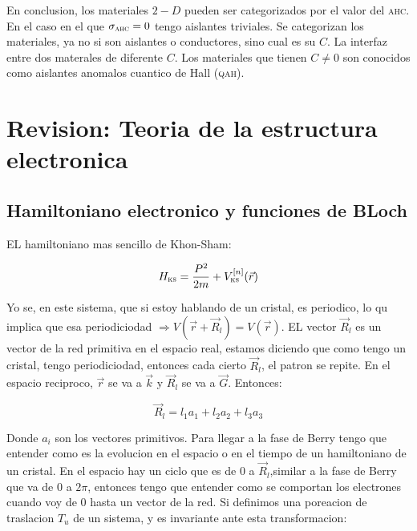 \documentclass[11pt,fleqn]{book}
\begin{document}
En conclusion, los materiales $2-D$ pueden ser categorizados por el valor del \textsc{ahc}. En el caso en el que $\sigma_{\textsc{ahc}}=0$ tengo aislantes triviales. Se categorizan los materiales, ya no si son aislantes o conductores, sino cual es su $C$. La interfaz entre dos materales de diferente $C$. Los materiales que tienen $C\neq0$ son conocidos como aislantes anomalos cuantico de Hall (\textsc{qah}).



\chapter{Revision: Teoria de la estructura electronica}
\section{Hamiltoniano electronico y funciones de BLoch}

EL hamiltoniano mas sencillo de Khon-Sham:

\begin{equation}
    H_{\textsc{ks}}=\frac{P^{2}}{2m}+V_{\textsc{ks}}^{[n]}(\vec{r})
\end{equation}

Yo se, en este sistema, que si estoy hablando de un cristal, es periodico, lo qu implica que esa periodiciodad $\Rightarrow V(\vec{r}+\vec{
R}_{l})=V(\vec{r})$. EL vector $\vec{R}_{l}$ es un vector de la red primitiva en el espacio real, estamos diciendo que como tengo un cristal, tengo periodiciodad, entonces cada cierto $\vec{R}_{l}$, el patron se repite. En el espacio reciproco, $\vec{r}$ se va a $\vec{k}$ y $\vec{R}_{l}$ se va a $\vec{G}$. Entonces:

\begin{equation}
    \vec{R}_{l}=l_{1}a_{1}+l_{2}a_{2}+l_{3}a_{3}
\end{equation}
 
Donde $a_{i}$ son los vectores primitivos. Para llegar a la fase de Berry tengo que entender como es la evolucion en el espacio o en el tiempo de un hamiltoniano de un cristal. En el espacio hay un ciclo que es de $0$ a $\vec{R}_{l}$,similar a la fase de Berry que va de $0$ a $2\pi$, entonces tengo que entender como se comportan  los electrones cuando voy de $0$ hasta un vector de la red. Si definimos una poreacion de traslacion $T_{u}$ de un sistema, y es invariante ante esta transformacion:
\end{document}
